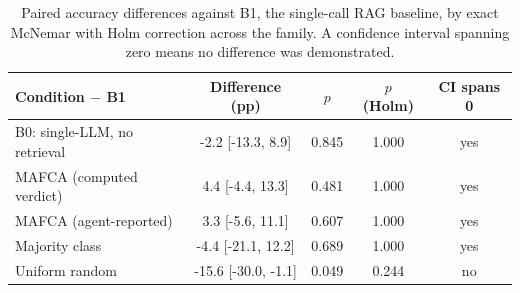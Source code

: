 \begin{table}[t]
\centering
\caption{Paired accuracy differences against B1, the single-call RAG baseline, by exact McNemar with Holm correction across the family. A confidence interval spanning zero means no difference was demonstrated.}
\label{tab:cond:diff}
\small
\begin{tabular}{@{}lcccc@{}}
\toprule
Condition $-$ B1 & Difference (pp) & $p$ & $p$ (Holm) & CI spans 0 \\
\midrule
B0: single-LLM, no retrieval & -2.2 [-13.3, 8.9] & 0.845 & 1.000 & yes \\
MAFCA (computed verdict) & 4.4 [-4.4, 13.3] & 0.481 & 1.000 & yes \\
MAFCA (agent-reported) & 3.3 [-5.6, 11.1] & 0.607 & 1.000 & yes \\
Majority class & -4.4 [-21.1, 12.2] & 0.689 & 1.000 & yes \\
Uniform random & -15.6 [-30.0, -1.1] & 0.049 & 0.244 & no \\
\bottomrule
\end{tabular}
\end{table}
